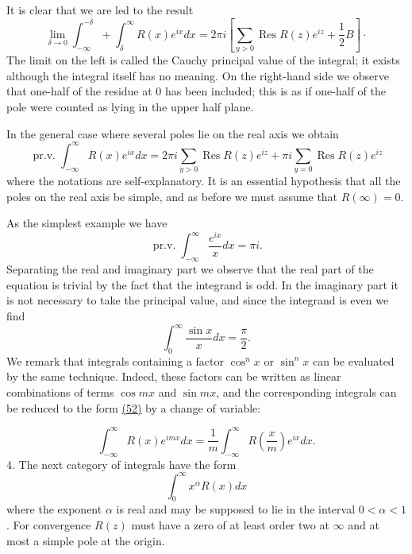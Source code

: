 It is clear that we are led to the result
\begin{equation*}
\lim _ {\delta \rightarrow 0} \int_ {- \infty} ^ {- \delta} + \int_ {\delta} ^ {\infty} R (x) e ^ {i x} d x = 2 \pi i \left[ \sum_ {y > 0} \operatorname{Res} R (z) e ^ {i z} + \frac {1}{2} B \right] \cdot
\end{equation*}
The limit on the left is called the Cauchy principal value of the integral; it exists although the integral itself has no meaning. On the right-hand side we observe that one-half of the residue at 0 has been included; this is as if one-half of the pole were counted as lying in the upper half plane.

In the general case where several poles lie on the real axis we obtain
\begin{equation*}
\operatorname{pr.v.} \int_ {- \infty} ^ {\infty} R (x) e ^ {i x} d x = 2 \pi i \sum_ {y > 0} \operatorname{Res} R (z) e ^ {i z} + \pi i \sum_ {y = 0} \operatorname{Res} R (z) e ^ {i z}
\end{equation*}
where the notations are self-explanatory. It is an essential hypothesis that all the poles on the real axis be simple, and as before we must assume that $R(\infty) = 0$.

As the simplest example we have
\begin{equation*}
\operatorname{pr.v.} \int_ {- \infty} ^ {\infty} \frac {e ^ {i x}}{x} d x = \pi i.
\end{equation*}
Separating the real and imaginary part we observe that the real part of the equation is trivial by the fact that the integrand is odd. In the imaginary part it is not necessary to take the principal value, and since the integrand is even we find
\begin{equation*}
\int_ {0} ^ {\infty} \frac {\sin x}{x} d x = \frac {\pi}{2}.
\end{equation*}
We remark that integrals containing a factor $\cos^{n}x$ or $\sin^{n}x$ can be evaluated by the same technique. Indeed, these factors can be written as linear combinations of terms $\cos mx$ and $\sin mx$, and the corresponding integrals can be reduced to the form \hyperref[eq:4.52]{(52)} by a change of variable:


\begin{equation*}
\int_ {- \infty} ^ {\infty} R (x) e ^ {i m x} d x = \frac {1}{m} \int_ {- \infty} ^ {\infty} R \left(\frac {x}{m}\right) e ^ {i x} d x.
\end{equation*}
4. The next category of integrals have the form
\begin{equation*}
\int_ {0} ^ {\infty} x ^ {\alpha} R (x) d x
\end{equation*}
where the exponent $\alpha$ is real and may be supposed to lie in the interval $0 < \alpha < 1$. For convergence $R(z)$ must have a zero of at least order two at $\infty$ and at most a simple pole at the origin.

